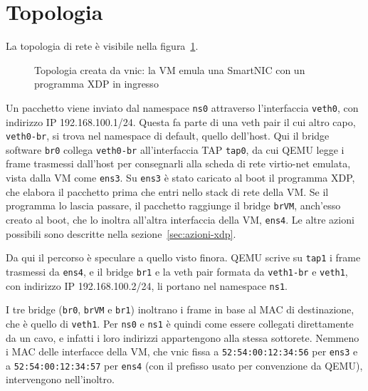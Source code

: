 \begin{table}[H]
    \centering
    
    \caption{Corrispondenza tra gli elementi di una SmartNIC e quelli di vnic}
    \label{tab:modello}
\end{table}

\section{Topologia}\label{sec:topologia}

La topologia di rete è visibile nella figura~\ref{fig:architettura}.

\begin{figure}[H]
    \centering
    
    \caption{Topologia creata da vnic: la VM emula una SmartNIC con un programma XDP in ingresso}
    \label{fig:architettura}
\end{figure}

Un pacchetto viene inviato dal namespace \texttt{ns0} attraverso l'interfaccia \texttt{veth0}, con indirizzo IP 192.168.100.1/24. Questa fa parte di una veth pair il cui altro capo, \texttt{veth0-br}, si trova nel namespace di default, quello dell'host. Qui il bridge software \texttt{br0} collega \texttt{veth0-br} all'interfaccia TAP \texttt{tap0}, da cui QEMU legge i frame trasmessi dall'host per consegnarli alla scheda di rete virtio-net emulata, vista dalla VM come \texttt{ens3}. Su \texttt{ens3} è stato caricato al boot il programma XDP, che elabora il pacchetto prima che entri nello stack di rete della VM. Se il programma lo lascia passare, il pacchetto raggiunge il bridge \texttt{brVM}, anch'esso creato al boot, che lo inoltra all'altra interfaccia della VM, \texttt{ens4}. Le altre azioni possibili sono descritte nella sezione~\ref{sec:azioni-xdp}.

Da qui il percorso è speculare a quello visto finora. QEMU scrive su \texttt{tap1} i frame trasmessi da \texttt{ens4}, e il bridge \texttt{br1} e la veth pair formata da \texttt{veth1-br} e \texttt{veth1}, con indirizzo IP 192.168.100.2/24, li portano nel namespace \texttt{ns1}.

I tre bridge (\texttt{br0}, \texttt{brVM} e \texttt{br1}) inoltrano i frame in base al MAC di destinazione, che è quello di \texttt{veth1}. Per \texttt{ns0} e \texttt{ns1} è quindi come essere collegati direttamente da un cavo, e infatti i loro indirizzi appartengono alla stessa sottorete. Nemmeno i MAC delle interfacce della VM, che vnic fissa a \texttt{52:54:00:12:34:56} per \texttt{ens3} e a \texttt{52:54:00:12:34:57} per \texttt{ens4} (con il prefisso usato per convenzione da QEMU), intervengono nell'inoltro.

